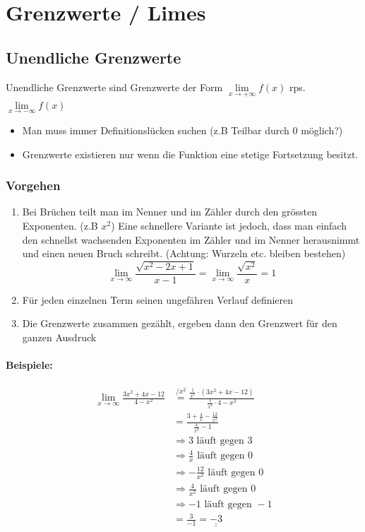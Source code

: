 \section{Grenzwerte / Limes}
\subsection{Unendliche Grenzwerte}
Unendliche Grenzwerte sind Grenzwerte der Form $\lim\limits_{x \rightarrow +\infty }f(x)$ rps. $\lim\limits_{x \rightarrow -\infty }f(x)$
\begin{itemize}
	\item Man muss immer Definitionslücken suchen (z.B Teilbar durch 0 möglich?)
	\item Grenzwerte existieren nur wenn die Funktion eine stetige Fortsetzung besitzt.
\end{itemize}

\subsubsection{Vorgehen}
\begin{enumerate}
	\item Bei Brüchen teilt man im Nenner und im Zähler durch den grössten Exponenten. (z.B $x^2$) Eine schnellere Variante ist jedoch, dass man einfach den schnellst wachsenden Exponenten im Zähler und im Nenner herausnimmt und einen neuen Bruch schreibt. (Achtung: Wurzeln etc. bleiben bestehen)
	\[
		\lim\limits_{x \rightarrow \infty} \frac{\sqrt{x^2 - 2x + 1}}{x-1} = \lim\limits_{x \rightarrow \infty} \frac{\sqrt{x^2}}{x} = 1
	\] 
	\item Für jeden einzelnen Term seinen ungefähren Verlauf definieren
	\item Die Grenzwerte zusammen gezählt, ergeben dann den Grenzwert für den ganzen Ausdruck
\end{enumerate}

\paragraph{Beispiele:}
\begin{align*}
	\lim\limits_{x \rightarrow \infty} \frac{3x^2 + 4x - 12}{4 -x^2} &\overset{/x^2}{=} \frac{\frac{1}{x^2} \cdot (3x^2 + 4x -12)}{\frac{1}{x^2} \cdot 4 - x^2} \\
	&= \frac{3 + \frac{4}{x} - \frac{12}{x^2}}{\frac{4}{x^2} - 1} \\
	&\Rightarrow 3 \text{ läuft gegen } 3 \\
	&\Rightarrow \frac{4}{x}\text{ läuft gegen } 0 \\
	&\Rightarrow -\frac{12}{x^2} \text{ läuft gegen } 0 \\
	&\Rightarrow \frac{4}{x^2} \text{ läuft gegen } 0 \\
	&\Rightarrow -1 \text{ läuft gegen } -1 \\
	&= \frac{3}{-1}  =  \underline{\underline{-3}}
\end{align*}
	
